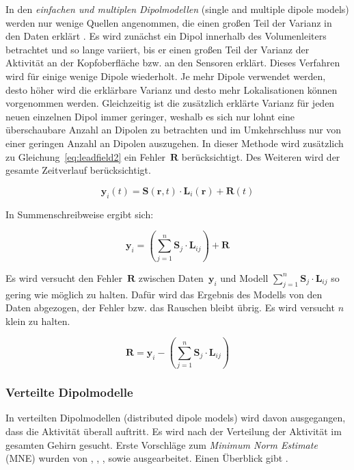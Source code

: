 \documentclass[doc,a4paper,12pt]{apa6}
\newcommand{\mx}[1]{\mathbf{#1}}
\begin{document}
In den \emph{einfachen und multiplen Dipolmodellen} (single and multiple dipole models) werden nur wenige Quellen angenommen, die einen großen Teil der Varianz in den Daten erklärt \parencite{scherg1990fundamentals}. Es wird zunächst ein Dipol innerhalb des Volumenleiters betrachtet und so lange variiert, bis er einen großen Teil der Varianz der Aktivität an der Kopfoberfläche bzw. an den Sensoren erklärt. Dieses Verfahren wird für einige wenige Dipole wiederholt. Je mehr Dipole verwendet werden, desto höher wird die erklärbare Varianz und desto mehr Lokalisationen können vorgenommen werden. Gleichzeitig ist die zusätzlich erklärte Varianz für jeden neuen einzelnen Dipol immer geringer, weshalb es sich nur lohnt eine überschaubare Anzahl an Dipolen zu betrachten und im Umkehrschluss nur von einer geringen Anzahl an Dipolen auszugehen. In dieser Methode wird zusätzlich zu Gleichung~\ref{eq:leadfield2} ein Fehler~$\mx{R}$ berücksichtigt. Des Weiteren wird der gesamte Zeitverlauf berücksichtigt.

\begin{equation}
\label{eq:leadfield-error}
\mx{y}_i(t) = \mx{S}(\mx{r},t) \cdot \mx{L}_i(\mx{r}) + \mx{R}(t)
\end{equation}

In Summenschreibweise ergibt sich:

\begin{equation}
\label{eq:leadfield-error-sum}
\mx{y}_i = \left( \sum_{j=1}^n \mx{S}_j \cdot \mx{L}_{ij} \right) + \mx{R}
\end{equation}

Es wird versucht den Fehler~$\mx{R}$ zwischen Daten~$\mx{y}_i$ und Modell $\sum_{j=1}^n \mx{S}_j \cdot \mx{L}_{ij}$ so gering wie möglich zu halten. Dafür wird das Ergebnis des Modells von den Daten abgezogen, der Fehler bzw. das Rauschen bleibt übrig. Es wird versucht $n$ klein zu halten.

\begin{equation}
\mx{R} = \mx{y}_i - \left( \sum_{j=1}^n \mx{S}_j \cdot \mx{L}_{ij} \right)
\end{equation}

\vspace*{5mm}

\subsubsection{Verteilte Dipolmodelle}

In verteilten Dipolmodellen (distributed dipole models) wird davon ausgegangen, dass die Aktivität überall auftritt. Es wird nach der Verteilung der Aktivität im gesamten Gehirn gesucht. Erste Vorschläge zum \emph{Minimum Norm Estimate} (MNE) wurden von \textcite{hamalainen1984interpreting}, \textcite{ilmoniemi1985forward}, \textcite{sarvas1987basic}, sowie \textcite{hamalainen1994interpreting} ausgearbeitet. Einen Überblick gibt \textcite{hamalainen1993magnetoencephalography}.
\end{document}
